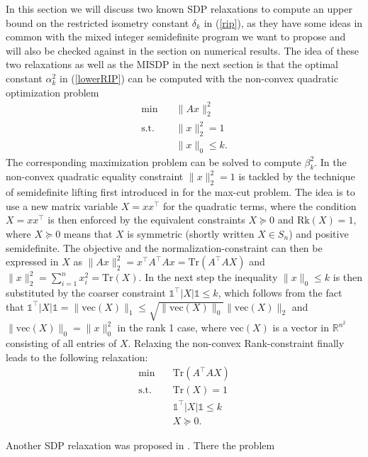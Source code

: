 \documentclass[a4paper,11pt,1p]{elsarticle}
\newcommand{\abs}[1]{\lvert{#1}\rvert}
\newcommand{\Norm}[2]{\lVert{#1}\rVert_{#2}}
\newcommand{\T}{^{\top}}
\newcommand{\Tr}{\text{Tr}}
\newcommand{\Rk}{\text{Rk}}
\newcommand{\vect}{\text{vec}}
\newcommand{\R}{\mathds{R}}
\newcommand{\ones}{\mathds{1}}
\begin{document}
In this section we will discuss two known SDP relaxations to compute an upper bound on the restricted isometry constant $\delta_k$ in (\ref{rip}), as they have some ideas in common with the mixed integer semidefinite program we want to 
propose and will also be checked against in the section on numerical results. The idea of these two relaxations as well as the MISDP in the next section is that the optimal constant $\alpha_k^2$ in (\ref{lowerRIP}) can be computed
with the non-convex quadratic optimization problem
\begin{align}\label{QP}
 \min \quad & \Norm{Ax}{2}^2 \nonumber \\
 \text{s.t.} \quad & \Norm{x}{2}^2 = 1 \tag{QP} \\
 & \Norm{x}{0} \leq k. \nonumber
\end{align}
The corresponding maximization problem can be solved to compute $\beta_k^2$. In \cite{Asp07} the non-convex quadratic equality constraint $\Norm{x}{2}^2 = 1$ is tackled by the technique of semidefinite lifting first introduced in \cite{GW95} 
for the max-cut problem. The idea is to use a new matrix variable $X=xx\T$ for the quadratic terms, where the condition $X=xx\T$ is then enforced by the equivalent constraints $X \succeq 0$ and $\Rk(X) = 1$, where 
$X \succeq 0$ means that $X$ is symmetric (shortly written \mbox{$X \in S_n$}) and positive semidefinite. The objective and the normalization-constraint can then be expressed in $X$ as  $\Norm{Ax}{2}^2 = x\T A\T Ax =
\Tr(A\T A X)$ and $\Norm{x}{2}^2 = \sum_{i=1}^n x_i^2 = \Tr(X)$. In the
next step the inequality $\Norm{x}{0} \leq k$ is then substituted by the coarser constraint $\ones\T
\abs{X} \ones \leq k$, which follows from the fact that $\ones\T\abs{X} \ones = \Norm{\vect(X)}{1}\leq \sqrt{\Norm{\vect(X)}{0}} \Norm{\vect(X)}{2}$ and $\Norm{\vect(X)}{0}=\Norm{x}{0}^2$ in the rank 1 case, where $\vect(X)$ is a vector
in $\R^{n^2}$ consisting of all entries of $X$. 
Relaxing the non-convex Rank-constraint finally leads to the following relaxation:
\begin{align}\label{Asp07}
 \min \quad & \Tr(A\T A X) \nonumber \\
 \text{s.t.} \quad & \Tr(X) = 1 \nonumber \\
 & \ones\T \abs{X} \ones \leq k \tag{A1} \\
 & X \succeq 0. \nonumber
\end{align}

Another SDP relaxation was proposed in \cite{Asp08}. There the problem
\end{document}
